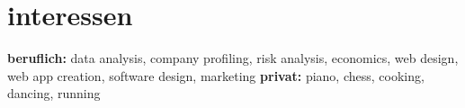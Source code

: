 \documentclass[]{friggeri-cv-a4}
\begin{document}

\section{interessen}

\textbf{beruflich:} data analysis, company profiling, risk analysis, economics, web design, web app creation, software design, marketing \textbf{privat:} piano, chess, cooking, dancing, running

\end{document}
